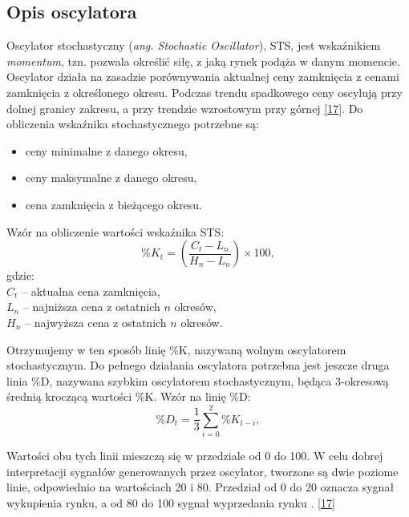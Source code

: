 \documentclass[12pt,a4paper,twoside, inzynierska]{pwr_wmat_praca_dyplomowa}
\theoremstyle{plain}
\numberwithin{theorem}{chapter}
\theoremstyle{definition}
\numberwithin{theorem}{chapter}
\begin{document}
	\subsection{Opis oscylatora}
	
	Oscylator stochastyczny (\textit{ang. Stochastic Oscillator}), STS, jest wskaźnikiem \textit{momentum}, tzn. pozwala określić siłę, z jaką rynek podąża w danym momencie. Oscylator działa na zasadzie porównywania aktualnej ceny zamknięcia z cenami zamknięcia z określonego okresu. Podczas trendu spadkowego ceny oscylują przy dolnej granicy zakresu, a przy trendzie wzrostowym przy górnej \hyperref[info17]{[17]}. Do obliczenia wskaźnika stochastycznego potrzebne są: 
	\begin{itemize}
		\item ceny minimalne z danego okresu,
		\item ceny maksymalne z danego okresu,
		\item cena zamknięcia z bieżącego okresu.
	\end{itemize}
	
	\noindent Wzór na obliczenie wartości wskaźnika STS:
	\begin{equation}
		\%K_t = \left( \frac{C_t - L_n}{H_n - L_n} \right) \times 100,
		\label{eq:OS}
	\end{equation}
	gdzie: \\
	\( C_t \) – aktualna cena zamknięcia, \\
	\( L_n \) – najniższa cena z ostatnich \( n \) okresów, \\
	\( H_n \) – najwyższa cena z ostatnich \( n \) okresów. \newline
	
	\noindent 
	 Otrzymujemy w ten sposób linię \%K, nazywaną wolnym oscylatorem stochastycznym. Do pełnego działania oscylatora potrzebna jest jeszcze druga linia \%D, nazywana szybkim oscylatorem stochastycznym, będąca 3-okresową średnią kroczącą wartości \%K. Wzór na linię \%D:
	 \begin{equation}
	 	\%D_t = \frac{1}{3} \sum_{i=0}^{2} \%K_{t - i},
	 	\label{eq:D}
	 \end{equation}

	Wartości obu tych linii mieszczą się w przedziale od 0 do 100. W celu dobrej interpretacji sygnałów generowanych przez oscylator, tworzone są dwie poziome linie, odpowiednio na wartościach 20 i 80. Przedział od 0 do 20 oznacza sygnał wykupienia rynku, a od 80 do 100 sygnał wyprzedania rynku . \hyperref[info17]{[17]} 
\end{document}
